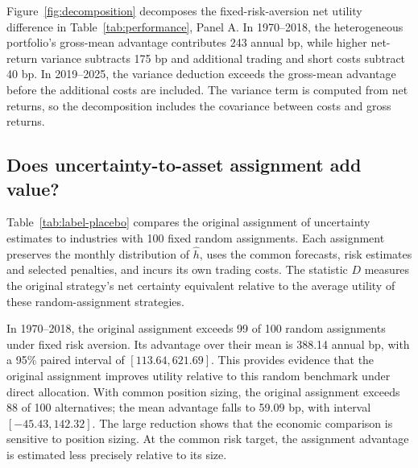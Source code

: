 Figure~\ref{fig:decomposition} decomposes the fixed-risk-aversion net utility difference in Table~\ref{tab:performance}, Panel A. In 1970--2018, the heterogeneous portfolio's gross-mean advantage contributes 243 annual bp, while higher net-return variance subtracts 175 bp and additional trading and short costs subtract 40 bp. In 2019--2025, the variance deduction exceeds the gross-mean advantage before the additional costs are included. The variance term is computed from net returns, so the decomposition includes the covariance between costs and gross returns.

\FloatBarrier
\subsection{Does uncertainty-to-asset assignment add value?}
\label{sec:label-diagnostic}
Table~\ref{tab:label-placebo} compares the original assignment of uncertainty estimates to industries with 100 fixed random assignments. Each assignment preserves the monthly distribution of $\widehat h$, uses the common forecasts, risk estimates and selected penalties, and incurs its own trading costs. The statistic $D$ measures the original strategy's net certainty equivalent relative to the average utility of these random-assignment strategies.

In 1970--2018, the original assignment exceeds 99 of 100 random assignments under fixed risk aversion. Its advantage over their mean is 388.14 annual bp, with a 95\% paired interval of $[113.64,621.69]$. This provides evidence that the original assignment improves utility relative to this random benchmark under direct allocation. With common position sizing, the original assignment exceeds 88 of 100 alternatives; the mean advantage falls to 59.09 bp, with interval $[-45.43,142.32]$. The large reduction shows that the economic comparison is sensitive to position sizing. At the common risk target, the assignment advantage is estimated less precisely relative to its size.

